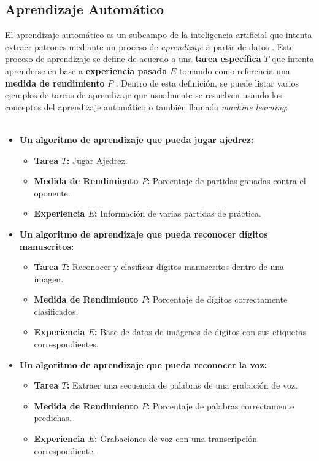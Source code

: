     \subsection{Aprendizaje Automático}
    El aprendizaje automático es un subcampo de la inteligencia artificial que intenta extraer 
    patrones mediante un proceso de \textit{aprendizaje} a partir de datos \cite{Mitchell1990}. Este proceso 
    de aprendizaje se define de acuerdo a una \textbf{tarea específica} $T$ que intenta aprenderse en base 
    a \textbf{experiencia pasada} $E$ tomando como referencia una \textbf{medida de rendimiento} $P$ . 
    Dentro de esta definición, se puede listar varios ejemplos de tareas de aprendizaje que usualmente se resuelven  
    usando los conceptos del aprendizaje automático o también llamado \textit{machine learning}:
    \\
    \\
    \begin{itemize}
        \item \textbf{Un algoritmo de aprendizaje que pueda jugar ajedrez:}
        \begin{itemize}
            \item \textbf{Tarea $T$:} Jugar Ajedrez.
            \item \textbf{Medida de Rendimiento $P$:} Porcentaje de partidas ganadas contra el oponente.
            \item \textbf{Experiencia $E$:} Información de varias partidas de práctica.
        \end{itemize}
        
        \item \textbf{Un algoritmo de aprendizaje que pueda reconocer dígitos manuscritos:}
        \begin{itemize}
            \item \textbf{Tarea $T$:} Reconocer y clasificar dígitos manuscritos dentro de una imagen.
            \item \textbf{Medida de Rendimiento $P$:} Porcentaje de dígitos correctamente clasificados.
            \item \textbf{Experiencia $E$:} Base de datos de imágenes de dígitos con sus etiquetas correspondientes.
        \end{itemize}

        \item \textbf{Un algoritmo de aprendizaje que pueda reconocer la voz:}
        \begin{itemize}
            \item \textbf{Tarea $T$:} Extraer una secuencia de palabras de una grabación de voz.
            \item \textbf{Medida de Rendimiento $P$:} Porcentaje de palabras correctamente predichas.
            \item \textbf{Experiencia $E$:} Grabaciones de voz con una transcripción correspondiente.
        \end{itemize}
    
    \end{itemize}
    

